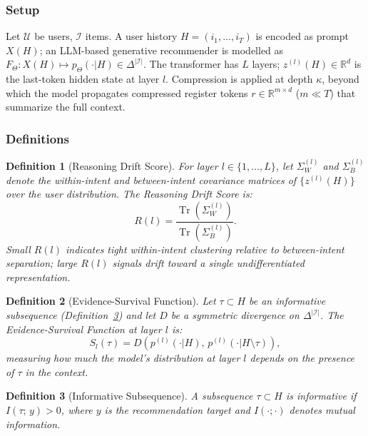 \documentclass[lettersize,journal]{IEEEtran}
\newtheorem{definition}{Definition}
\newcommand{\R}{\mathbb{R}}
\newcommand{\Tr}{\operatorname{Tr}}
\begin{document}
\subsubsection{Setup}

Let $\mathcal{U}$ be users, $\mathcal{I}$ items.
A user history $H = (i_1, \ldots, i_T)$ is encoded as prompt $X(H)$;
an LLM-based generative recommender is modelled as
$F_\Theta : X(H) \mapsto p_\Theta(\cdot | H) \in \Delta^{|\mathcal{I}|}$.
The transformer has $L$ layers; $z^{(l)}(H) \in \R^{d}$ is the
last-token hidden state at layer $l$.
Compression is applied at depth $\kappa$, beyond which the model
propagates compressed register tokens $r \in \R^{m \times d}$
($m \ll T$) that summarize the full context.

\subsubsection{Definitions}

\begin{definition}[Reasoning Drift Score]
\label{def:R}
For layer $l \in \{1,\ldots,L\}$, let $\Sigma_W^{(l)}$ and
$\Sigma_B^{(l)}$ denote the within-intent and between-intent
covariance matrices of $\{z^{(l)}(H)\}$ over the user distribution.
The \emph{Reasoning Drift Score} is:
\[
  R(l) = \frac{\Tr(\Sigma_W^{(l)})}{\Tr(\Sigma_B^{(l)})}.
\]
Small $R(l)$ indicates tight within-intent clustering relative to
between-intent separation; large $R(l)$ signals drift toward a
single undifferentiated representation.
\end{definition}

\begin{definition}[Evidence-Survival Function]
\label{def:S}
Let $\tau \subset H$ be an \emph{informative subsequence}
(Definition~\ref{def:informative}) and let $D$ be a
symmetric divergence on $\Delta^{|\mathcal{I}|}$.
The \emph{Evidence-Survival Function} at layer $l$ is:
\[
  S_l(\tau) = D\!\left(p^{(l)}(\cdot|H),\,
                       p^{(l)}(\cdot|H\setminus\tau)\right),
\]
measuring how much the model's distribution at layer $l$ depends
on the presence of $\tau$ in the context.
\end{definition}

\begin{definition}[Informative Subsequence]
\label{def:informative}
A subsequence $\tau \subset H$ is \emph{informative} if
$I(\tau;\, y) > 0$, where $y$ is the recommendation target and
$I(\cdot;\cdot)$ denotes mutual information.
\end{definition}
\end{document}
